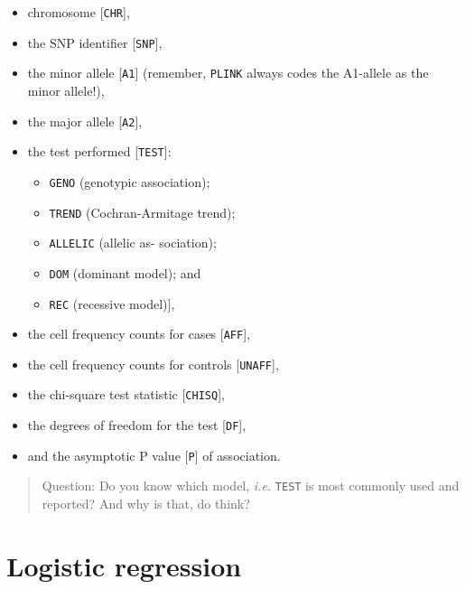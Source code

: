 \documentclass[
]{book}
\newcommand{\passthrough}[1]{#1}
\providecommand{\tightlist}{%
  \setlength{\itemsep}{0pt}\setlength{\parskip}{0pt}}
\begin{document}
\begin{itemize}
\tightlist
\item
  chromosome {[}\passthrough{\lstinline!CHR!}{]},
\item
  the SNP identifier {[}\passthrough{\lstinline!SNP!}{]},
\item
  the minor allele {[}\passthrough{\lstinline!A1!}{]} (remember, \passthrough{\lstinline!PLINK!} always codes the A1-allele as the minor allele!),
\item
  the major allele {[}\passthrough{\lstinline!A2!}{]},
\item
  the test performed {[}\passthrough{\lstinline!TEST!}{]}:

  \begin{itemize}
  \tightlist
  \item
    \passthrough{\lstinline!GENO!} (genotypic association);
  \item
    \passthrough{\lstinline!TREND!} (Cochran-Armitage trend);
  \item
    \passthrough{\lstinline!ALLELIC!} (allelic as- sociation);
  \item
    \passthrough{\lstinline!DOM!} (dominant model); and
  \item
    \passthrough{\lstinline!REC!} (recessive model){]},
  \end{itemize}
\item
  the cell frequency counts for cases {[}\passthrough{\lstinline!AFF!}{]},
\item
  the cell frequency counts for controls {[}\passthrough{\lstinline!UNAFF!}{]},
\item
  the chi-square test statistic {[}\passthrough{\lstinline!CHISQ!}{]},
\item
  the degrees of freedom for the test {[}\passthrough{\lstinline!DF!}{]},
\item
  and the asymptotic P value {[}\passthrough{\lstinline!P!}{]} of association.
\end{itemize}

\begin{quote}
Question: Do you know which model, \emph{i.e.} \passthrough{\lstinline!TEST!} is most commonly used and reported? And why is that, do think?
\end{quote}

\hypertarget{logistic-regression}{%
\section{Logistic regression}\label{logistic-regression}}
\end{document}
